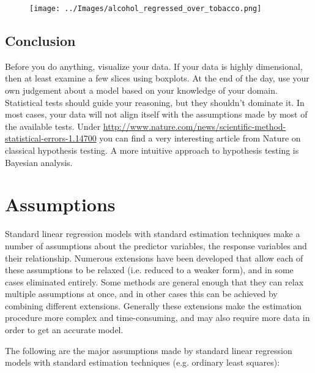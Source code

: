\begin{figure}
  \centering
  \texttt{[image: ../Images/alcohol\_regressed\_over\_tobacco.png]}
\end{figure}

\subsection{Conclusion}

Before you do anything, visualize your data. If your data is highly dimensional, then at least examine a few slices using boxplots. At the end of the day, use your own judgement about a model based on your knowledge of your domain. Statistical tests should guide your reasoning, but they shouldn’t dominate it. In most cases, your data will not align itself with the assumptions made by most of the available tests. Under \url{http://www.nature.com/news/scientific-method-statistical-errors-1.14700} you can find a very interesting article from Nature on classical hypothesis testing. A more intuitive approach to hypothesis testing is Bayesian analysis.

\section{Assumptions} \label{sec:Assumptions}

Standard linear regression models with standard estimation techniques make a number of assumptions about the predictor variables, the response variables and their relationship.  Numerous extensions have been developed that allow each of these assumptions to be relaxed (i.e. reduced to a weaker form), and in some cases eliminated entirely.  Some methods are general enough that they can relax multiple assumptions at once, and in other cases this can be achieved by combining different extensions.  Generally these extensions make the estimation procedure more complex and time-consuming, and may also require more data in order to get an accurate model.

The following are the major assumptions made by standard linear regression models with standard estimation techniques (e.g. ordinary least squares):

